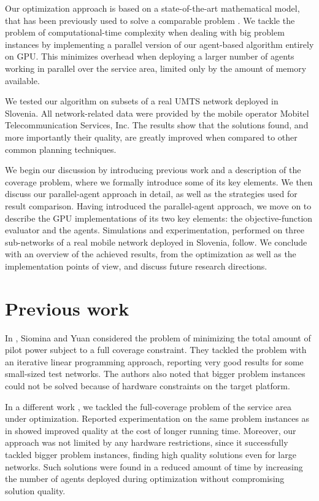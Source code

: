 Our optimization approach is based on a state-of-the-art mathematical
model, that has been previously used to solve a comparable problem
\cite{Chen-Yuan_CPICH.optimization:2008}. We tackle the problem of
computational-time complexity when dealing with big problem instances
by implementing a parallel version of our agent-based algorithm entirely
on GPU. This minimizes overhead when deploying a larger number of
agents working in parallel over the service area, limited only by
the amount of memory available. 

We tested our algorithm on subsets of a real UMTS network deployed
in Slovenia. All network-related data were provided by the mobile
operator Mobitel Telecommunication Services, Inc. The results show
that the solutions found, and more importantly their quality, are
greatly improved when compared to other common planning techniques.

We begin our discussion by introducing previous work and a description
of the coverage problem, where we formally introduce some of its key
elements. We then discuss our parallel-agent approach in detail, as
well as the strategies used for result comparison. Having introduced
the parallel-agent approach, we move on to describe the GPU implementations
of its two key elements: the objective-function evaluator and the
agents. Simulations and experimentation, performed on three sub-networks
of a real mobile network deployed in Slovenia, follow. We conclude
with an overview of the achieved results, from the optimization as
well as the implementation points of view, and discuss future research
directions.


\section{Previous work}

In \cite{Siomina:Minimum.pilot.power.for.service.coverage}, Siomina
and Yuan considered the problem of minimizing the total amount of
pilot power subject to a full coverage constraint. They tackled the
problem with an iterative linear programming approach, reporting very
good results for some small-sized test networks. The authors also
noted that bigger problem instances could not be solved because of
hardware constraints on the target platform.

In a different work \cite{Benedicic_Pilot.power.optimization:2010},
we tackled the full-coverage problem of the service area under optimization.
Reported experimentation on the same problem instances as in \cite{Siomina:Minimum.pilot.power.for.service.coverage}
showed improved quality at the cost of longer running time. Moreover,
our approach was not limited by any hardware restrictions, since it
successfully tackled bigger problem instances, finding high quality
solutions even for large networks. Such solutions were found in a
reduced amount of time by increasing the number of agents deployed
during optimization without compromising solution quality.

